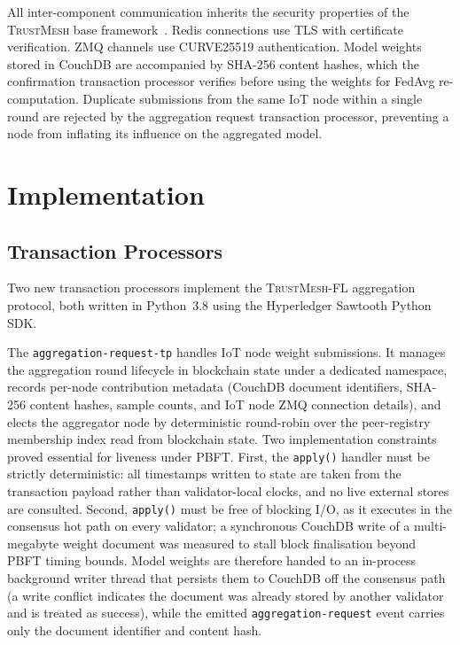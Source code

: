 \documentclass[lettersize,journal]{IEEEtran}
\newcommand{\tmfl}{\textsc{TrustMesh-FL}}
\newcommand{\tm}{\textsc{TrustMesh}}
\begin{document}
All inter-component communication inherits the security properties of the \tm{} base
framework~\cite{rangwala2025trustmesh}. Redis connections use TLS with certificate
verification. ZMQ channels use CURVE25519 authentication. Model weights stored in CouchDB
are accompanied by SHA-256 content hashes, which the confirmation transaction processor
verifies before using the weights for FedAvg re-computation. Duplicate submissions from the
same IoT node within a single round are rejected by the aggregation request transaction
processor, preventing a node from inflating its influence on the aggregated model.

\section{Implementation}
\label{sec:implementation}

\subsection{Transaction Processors}

Two new transaction processors implement the \tmfl{} aggregation protocol, both written
in Python~3.8 using the Hyperledger Sawtooth Python SDK.

The \texttt{aggregation-request-tp} handles IoT node weight submissions. It manages the
aggregation round lifecycle in blockchain state under a dedicated namespace, records
per-node contribution metadata (CouchDB document identifiers, SHA-256 content hashes,
sample counts, and IoT node ZMQ connection details), and elects the aggregator node by
deterministic round-robin over the peer-registry membership index read from blockchain
state. Two implementation constraints proved essential for liveness under PBFT. First,
the \texttt{apply()} handler must be strictly deterministic: all timestamps written to
state are taken from the transaction payload rather than validator-local clocks, and no
live external stores are consulted. Second, \texttt{apply()} must be free of blocking
I/O, as it executes in the consensus hot path on every validator; a synchronous CouchDB
write of a multi-megabyte weight document was measured to stall block finalisation beyond
PBFT timing bounds. Model weights are therefore handed to an in-process background writer
thread that persists them to CouchDB off the consensus path (a write conflict indicates
the document was already stored by another validator and is treated as success), while
the emitted \texttt{aggregation-request} event carries only the document identifier and
content hash.
\end{document}
